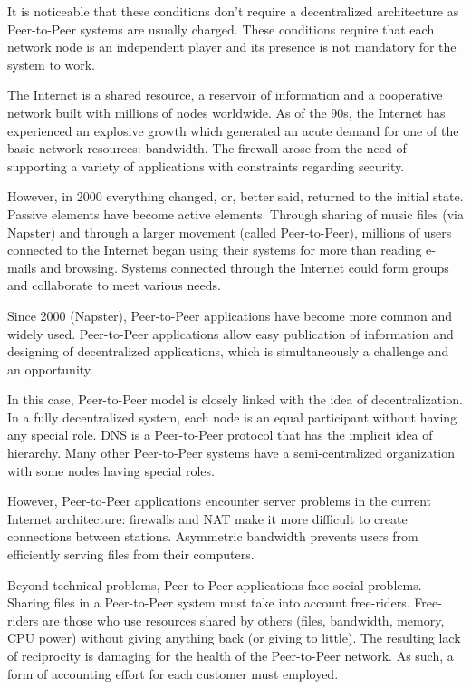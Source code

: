 It is noticeable that these conditions don't require a decentralized
architecture as Peer-to-Peer systems are usually charged. These conditions
require that each network node is an independent player and its presence
is not mandatory for the system to work.

The Internet is a shared resource, a reservoir of information and a
cooperative network built with millions of nodes worldwide. As of the 90s, the
Internet has experienced an explosive growth which generated an acute demand
for one of the basic network resources: bandwidth. The firewall arose from the
need of supporting a variety of applications with constraints regarding
security.

However, in 2000 everything changed, or, better said, returned to the initial
state. Passive elements have become active elements. Through sharing of music
files (via Napster) and through a larger movement (called Peer-to-Peer),
millions of users connected to the Internet began using their systems
for more than reading e-mails and browsing. Systems connected through the
Internet could form groups and collaborate to meet various needs.

Since 2000 (Napster), Peer-to-Peer applications have become more common and
widely used. Peer-to-Peer applications allow easy publication of information
and designing of decentralized applications, which is simultaneously a
challenge and an opportunity.

In this case, Peer-to-Peer model is closely linked with the idea of
decentralization. In a fully decentralized system, each node is an equal
participant without having any special role. DNS is a Peer-to-Peer protocol
that has the implicit idea of hierarchy. Many other Peer-to-Peer systems have
a semi-centralized organization with some nodes having special roles.

However, Peer-to-Peer applications encounter server problems in the current
Internet architecture: firewalls and NAT make it more difficult to create
connections between stations. Asymmetric bandwidth prevents users from
efficiently serving files from their computers.

Beyond technical problems, Peer-to-Peer applications face social problems.
Sharing files in a Peer-to-Peer system must take into account free-riders.
Free-riders are those who use resources shared by others (files, bandwidth,
memory, CPU power) without giving anything back (or giving to little). The
resulting lack of reciprocity is damaging for the health of the Peer-to-Peer
network. As such, a form of accounting effort for each customer must employed.

